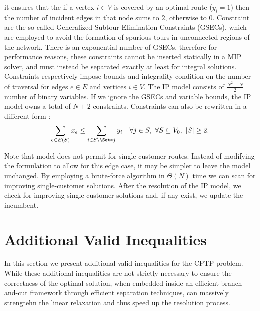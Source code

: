 it ensures that the if a vertex $i \in V$ is covered by an optimal route ($y_i = 1$)
then the number of incident edges in that node sums to $2$, otherwise to $0$.
Constraint  are the so-called Generalized Subtour Elimination Constraints (GSECs),
which are employed to avoid the formation of spurious tours in unconnected regions of the network.
There is an exponential number of GSECs,
therefore for performance reasons,
these constraints cannot be inserted statically in a MIP solver,
and must instead be separated exactly at least for integral solutions.
Constraints  respectively
impose bounds and integrality condition
on the number of traversal for edges $e \in E$ and vertices $i \in V$.
The IP model consists of $\frac{N^2 + N}{2}$ number of binary variables.
If we ignore the GSECs and variable bounds, the IP model owns a total of $N + 2$ constraints.
Constraints 
can also be rewritten in a different form \parencite{jepsen2014}:
\begin{equation}
	\label{eq:cptp-gsec-constraints-v2}
	\sum\limits_{e \in E(S)} x_e \le \sum\limits_{i \in S \setminus \Set*{j}} y_i \quad \forall j \in S,\ \forall S \subseteq V_0,\ |S| \ge 2.
\end{equation}

Note that model
does not permit for single-customer routes.
Instead of modifying the formulation to allow for this edge case,
it may be simpler to leave the model unchanged.
By employing a brute-force algorithm in $\Theta(N)$ time we can scan for improving single-customer solutions.
After the resolution of the IP model,
we check for improving single-customer solutions and,
if any exist,
we update the incumbent.

\section{Additional Valid Inequalities}
\label{sec:cptp-additional-valid-inequalities}

In this section we present additional valid inequalities for the CPTP problem.
While these additional inequalities are not strictly necessary
to ensure the correctness of the optimal solution,
when embedded inside an efficient branch-and-cut framework through efficient separation techniques,
can massively strengtehn the linear relaxation and thus speed up the resolution process.

